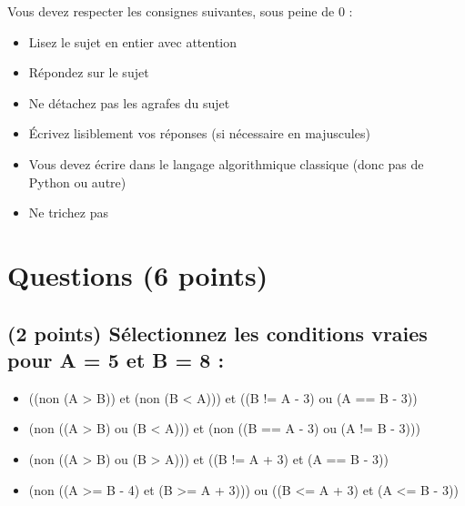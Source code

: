 \documentclass[11pt,a4paper]{article}
\begin{document}
\MakeExamTitle                   %


\bigskip

Vous devez respecter les consignes suivantes, sous peine de 0 :

\begin{itemize}
\item Lisez le sujet en entier avec attention
\item Répondez sur le sujet
\item Ne détachez pas les agrafes du sujet
\item \'Ecrivez lisiblement vos réponses (si nécessaire en majuscules)
\item Vous devez écrire dans le langage algorithmique classique (donc pas de Python ou autre)
\item Ne trichez pas
\end{itemize}



\section{Questions (6 points)}

\subsection{(2 points) Sélectionnez les conditions vraies pour A = 5 et B = 8 : }

\bigskip

\begin{itemize}
  \item[\CaseCoche] ((non (A > B)) et (non (B < A))) et ((B != A - 3) ou (A == B - 3)) \\ %
  \item[\CaseCoche] (non ((A > B) ou (B < A))) et (non ((B == A - 3) ou (A != B - 3))) \\ %
  \item[\CaseCoche] (non ((A > B) ou (B > A))) et ((B != A + 3) et (A == B - 3)) \\ %
  \item[\CaseCoche] (non ((A >= B - 4) et (B >= A + 3))) ou ((B <= A + 3) et (A <= B - 3)) \\ %
\end{itemize}
\end{document}
